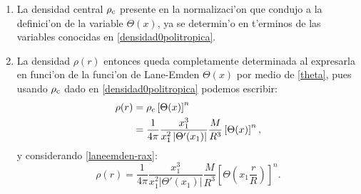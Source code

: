 \begin{enumerate}
 \item La densidad central $\rho_{\rm c}$ presente en la normalizaci'on que condujo a la definici'on de la variable $\Theta(x)$, ya se determin'o en t'erminos de las variables conocidas en \eqref{densidad0politropica}.

\item La densidad $\rho(r)$ entonces queda completamente determinada al expresarla en funci'on de la funci'on de Lane-Emden $\Theta(x)$ por medio de \eqref{theta}, pues usando $\rho_{\rm c}$ dado en \eqref{densidad0politropica} podemos escribir:
\begin{align}
 \rho(r)&=\rho_{\rm c}\left[\Theta(x)\right]^n\label{rhoder}\\
&=\frac{1}{4\pi}\frac{x_1^3}{x_1^2\left|\Theta'(x_1)\right|}\frac{M}{R^3}\left[\Theta(x)\right]^n,
\end{align}
y considerando \eqref{laneemden-rax}:
\begin{equation}\label{densidadpolitropica}
 \rho(r)=\frac{1}{4\pi}\frac{x_1^3}{x_1^2\left|\Theta'(x_1)\right|}\frac{M}{R^3}\left[\Theta\left(x_1\frac{r}{R}\right)\right]^n.
\end{equation}


\end{enumerate}
